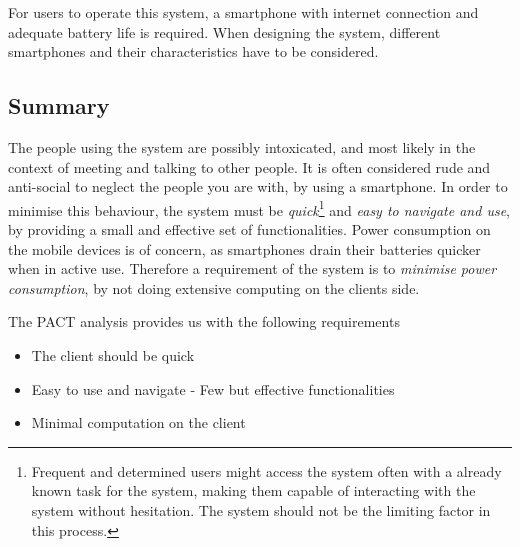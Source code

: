 For users to operate this system, a smartphone with internet connection and adequate battery life is required. When designing the system, different smartphones and their characteristics have to be considered.

\subsection{Summary}
\label{sec:pact_summary}

The people using the system are possibly intoxicated, and most likely in the context of meeting and talking to other people. It is often considered rude and anti-social to neglect the people you are with, by using a smartphone. In order to minimise this behaviour, the system must be \textit{quick}\footnote{Frequent and determined users might access the system often with a already known task for the system, making them capable of interacting with the system without hesitation. The system should not be the limiting factor in this process.} and \textit{easy to navigate and use}, by providing a small and effective set of functionalities.
Power consumption on the mobile devices is of concern, as smartphones drain their batteries quicker when in active use. Therefore a requirement of the system is to \textit{minimise power consumption}, by not doing extensive computing on the clients side.


The PACT analysis provides us with the following requirements
\begin{itemize}
  \item The client should be quick
  \item Easy to use and navigate - Few but effective functionalities
  \item Minimal computation on the client
\end{itemize}

